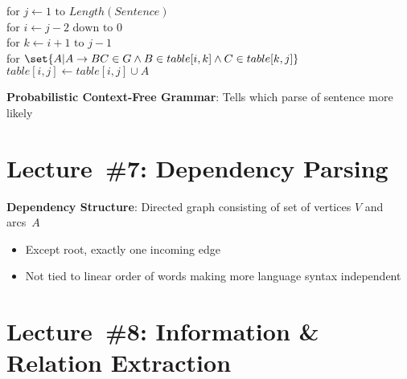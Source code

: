 \documentclass[9pt]{extarticle}
\renewcommand{\green}[1]{{\color{ForestGreen} #1}}
\begin{document}
\begin{multicols}{3}
  for $j \gets 1 \text{ to } Length(Sentence)$ \\
  \hspace*{0.2cm}for $i \gets j-2 \text{ down to } 0$ \\
  \hspace*{0.4cm}for $k \gets i+1 \text{ to } j - 1$ \\
  \hspace*{0.6cm}for $\set{A \vert A \rightarrow BC \in G \wedge B \in table[i,k] \wedge C \in table[k,j]}$
  \hspace*{0.8cm}$table[i,j] \gets table[i,j] \cup A$

  \textbf{\green{Probabilistic Context-Free Grammar}}: Tells which parse of sentence more likely

  \section*{Lecture~\#7: Dependency Parsing}

  \textbf{\green{Dependency Structure}}: Directed graph consisting of set of vertices $V$ and arcs~$A$
  \begin{itemize}
    \item Except root, exactly one incoming edge
    \item Not tied to linear order of words making more language syntax independent
  \end{itemize}

  \section*{Lecture~\#8: Information \& Relation Extraction}

\end{multicols}
\end{document}
